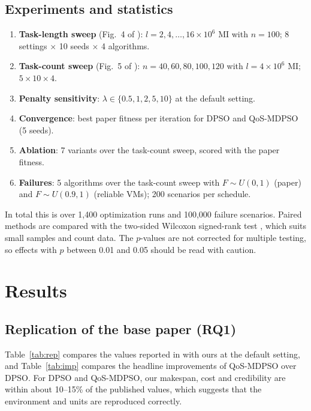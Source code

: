 \documentclass[pdflatex,sn-basic]{sn-jnl}
\theoremstyle{thmstyleone}%
\theoremstyle{thmstyletwo}%
\theoremstyle{thmstylethree}%
\begin{document}
\subsection{Experiments and statistics}\label{sec6.3}
\begin{enumerate}
\item \textbf{Task-length sweep} (Fig.~4 of \citet{ouyang2025}): $l=2,4,\dots,16\times10^6$ MI with $n=100$; 8 settings $\times$ 10 seeds $\times$ 4 algorithms.
\item \textbf{Task-count sweep} (Fig.~5 of \citet{ouyang2025}): $n=40,60,80,100,120$ with $l=4\times10^6$ MI; $5\times10\times4$.
\item \textbf{Penalty sensitivity}: $\lambda\in\{0.5,1,2,5,10\}$ at the default setting.
\item \textbf{Convergence}: best paper fitness per iteration for DPSO and QoS-MDPSO (5 seeds).
\item \textbf{Ablation}: 7 variants over the task-count sweep, scored with the paper fitness.
\item \textbf{Failures}: 5 algorithms over the task-count sweep with $F\sim U(0,1)$ (paper) and $F\sim U(0.9,1)$ (reliable VMs); 200 scenarios per schedule.
\end{enumerate}
In total this is over 1,400 optimization runs and 100,000 failure scenarios. Paired methods are compared with the two-sided Wilcoxon signed-rank test \citep{wilcoxon1945}, which suits small samples and count data. The $p$-values are not corrected for multiple testing, so effects with $p$ between 0.01 and 0.05 should be read with caution.

\section{Results}\label{sec7}
\subsection{Replication of the base paper (RQ1)}\label{sec7.1}
Table~\ref{tab:rep} compares the values reported in \citet{ouyang2025} with ours at the default setting, and Table~\ref{tab:imp} compares the headline improvements of QoS-MDPSO over DPSO. For DPSO and QoS-MDPSO, our makespan, cost and credibility are within about 10--15\% of the published values, which suggests that the environment and units are reproduced correctly.
\end{document}
